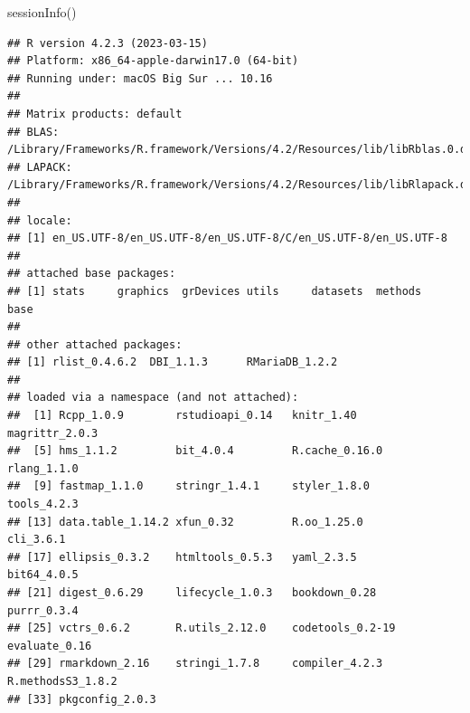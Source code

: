 \documentclass[
  11pt,
  oneside]{book}
\newenvironment{Shaded}{\begin{snugshade}}{\end{snugshade}}
\newcommand{\AttributeTok}[1]{\textcolor[rgb]{0.77,0.63,0.00}{#1}}
\newcommand{\CommentTok}[1]{\textcolor[rgb]{0.56,0.35,0.01}{\textit{#1}}}
\newcommand{\ConstantTok}[1]{\textcolor[rgb]{0.00,0.00,0.00}{#1}}
\newcommand{\DecValTok}[1]{\textcolor[rgb]{0.00,0.00,0.81}{#1}}
\newcommand{\FunctionTok}[1]{\textcolor[rgb]{0.00,0.00,0.00}{#1}}
\newcommand{\NormalTok}[1]{#1}
\newcommand{\OtherTok}[1]{\textcolor[rgb]{0.56,0.35,0.01}{#1}}
\newcommand{\SpecialCharTok}[1]{\textcolor[rgb]{0.00,0.00,0.00}{#1}}
\newcommand{\StringTok}[1]{\textcolor[rgb]{0.31,0.60,0.02}{#1}}
\begin{document}
\begin{Shaded}
\end{Shaded}

\begin{Shaded}
\begin{Highlighting}[]
\FunctionTok{sessionInfo}\NormalTok{()}
\end{Highlighting}
\end{Shaded}

\begin{verbatim}
## R version 4.2.3 (2023-03-15)
## Platform: x86_64-apple-darwin17.0 (64-bit)
## Running under: macOS Big Sur ... 10.16
## 
## Matrix products: default
## BLAS:   /Library/Frameworks/R.framework/Versions/4.2/Resources/lib/libRblas.0.dylib
## LAPACK: /Library/Frameworks/R.framework/Versions/4.2/Resources/lib/libRlapack.dylib
## 
## locale:
## [1] en_US.UTF-8/en_US.UTF-8/en_US.UTF-8/C/en_US.UTF-8/en_US.UTF-8
## 
## attached base packages:
## [1] stats     graphics  grDevices utils     datasets  methods   base     
## 
## other attached packages:
## [1] rlist_0.4.6.2  DBI_1.1.3      RMariaDB_1.2.2
## 
## loaded via a namespace (and not attached):
##  [1] Rcpp_1.0.9        rstudioapi_0.14   knitr_1.40        magrittr_2.0.3   
##  [5] hms_1.1.2         bit_4.0.4         R.cache_0.16.0    rlang_1.1.0      
##  [9] fastmap_1.1.0     stringr_1.4.1     styler_1.8.0      tools_4.2.3      
## [13] data.table_1.14.2 xfun_0.32         R.oo_1.25.0       cli_3.6.1        
## [17] ellipsis_0.3.2    htmltools_0.5.3   yaml_2.3.5        bit64_4.0.5      
## [21] digest_0.6.29     lifecycle_1.0.3   bookdown_0.28     purrr_0.3.4      
## [25] vctrs_0.6.2       R.utils_2.12.0    codetools_0.2-19  evaluate_0.16    
## [29] rmarkdown_2.16    stringi_1.7.8     compiler_4.2.3    R.methodsS3_1.8.2
## [33] pkgconfig_2.0.3
\end{verbatim}
\end{document}
